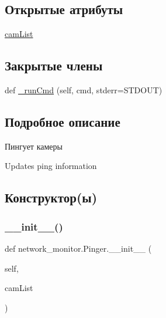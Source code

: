 \subsection*{Открытые атрибуты}
\begin{DoxyCompactItemize}
\item 
\hyperlink{classnetwork__monitor_1_1_pinger_a9e16cc56e9483b16869dccd9b87045d9}{cam\+List}
\end{DoxyCompactItemize}
\subsection*{Закрытые члены}
\begin{DoxyCompactItemize}
\item 
def \hyperlink{classnetwork__monitor_1_1_pinger_a8fa23184da9cbc4a3cafa6b08aee2cde}{\+\_\+run\+Cmd} (self, cmd, stderr=S\+T\+D\+O\+UT)
\end{DoxyCompactItemize}


\subsection{Подробное описание}
Пингует камеры 

\begin{DoxyVerb}Updates ping information \end{DoxyVerb}
 

\subsection{Конструктор(ы)}
\mbox{\label{classnetwork__monitor_1_1_pinger_aa24b595bfd313e99ec0e0e9bd2f648d0}} 
\subsubsection{\texorpdfstring{\+\_\+\+\_\+init\+\_\+\+\_\+()}{\_\_init\_\_()}}
{\footnotesize\ttfamily def network\+\_\+monitor.\+Pinger.\+\_\+\+\_\+init\+\_\+\+\_\+ (\begin{DoxyParamCaption}\item[{}]{self,  }\item[{}]{cam\+List }\end{DoxyParamCaption})}



